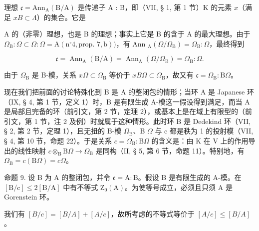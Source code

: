 理想 \(\mathfrak{c} = \mathrm{Ann}_{\mathrm{A}}(\mathrm{B / A})\) 是传递子 A : B，即（VII, § 1, 第 1 节）K 的元素 \(x\)（满足 \(xB \subset \Lambda\)）的集合。它是

A 的（非零）理想，也是 B 的理想；事实上它是 B 的含于 A 的最大理想。由于 \(\Omega_{\mathrm{B}} : \Omega \subset \Omega : \Omega = \mathrm{A} (\mathrm{n}^{\circ} 4, \text{prop. } 7, \mathrm{b}))\)，有 Ann \(_{\mathrm{A}}(\Omega/\Omega_{\mathrm{B}}) = \Omega_{\mathrm{B}} : \Omega\)，最终得到

\[
\mathfrak {c} = \operatorname{Ann} _ {\mathrm{A}} (\mathrm{B/A}) = \operatorname{Ann} _ {\mathrm{A}} (\Omega / \Omega_ {\mathrm{B}}) = \Omega_ {\mathrm{B}}: \Omega .
\]

由于 \(\Omega_{\mathrm{B}}\) 是 B-模，关系 \(x\Omega \subset \Omega_{\mathrm{B}}\) 等价于 \(xB\Omega \subset \Omega_{\mathrm{B}}\)，故又有 \(\mathfrak{c} = \Omega_{\mathrm{B}}: \mathrm{B}\Omega\)。

现在我们把前面的讨论特殊化到 B 是 A 的整闭包的情形；当环 A 是 Japanese 环（IX, § 4, 第 1 节，定义 1）时，B 是有限生成 A-模这一假设得到满足，而当 A 是局部且完备的环（前引文，第 2 节，定理 2），或基本上是在域上有限型的（前引文，第 1 节，注 2 及例）时就属于这种情形。此时环 B 是 Dedekind 环（VII, § 2, 第 2 节，定理 1），且无扭的 B-模 \(\Omega_{\mathrm{B}}\)、B \(\Omega\) 与 c 都是秩为 1 的投射模（VII, § 4, 第 10 节，命题 22）。于是关系 \(c = \Omega_{\mathrm{B}} : \mathrm{B}\Omega\) 的含义是：由 K 在 V 上的作用导出的线性映射 \(c \otimes_{\mathrm{B}} \mathrm{B}\Omega \to \Omega_{\mathrm{B}}\) 是同构（II, § 5, 第 6 节，命题 11）。特别地，有 \(\Omega_{\mathrm{B}} = c(\mathrm{B}\Omega) = c\Omega\)。

命题 9. 设 B 为 A 的整闭包，并令 \(\mathfrak{c} = \mathrm{A}:\mathrm{B}\)。假设 B 是有限生成的 A-模。在 \([\mathrm{B} / \mathrm{c}] \leqslant 2[\mathrm{B} / \mathrm{A}]\) 中有不等式 \(\mathrm{Z}_0(\mathrm{A})\)。为使等号成立，必须且只须 A 是 Gorenstein 环。

我们有 \([B/c] = [B/A] + [A/c]\)，故所考虑的不等式等价于 \([A/c] \leqslant [B/A]\)。

